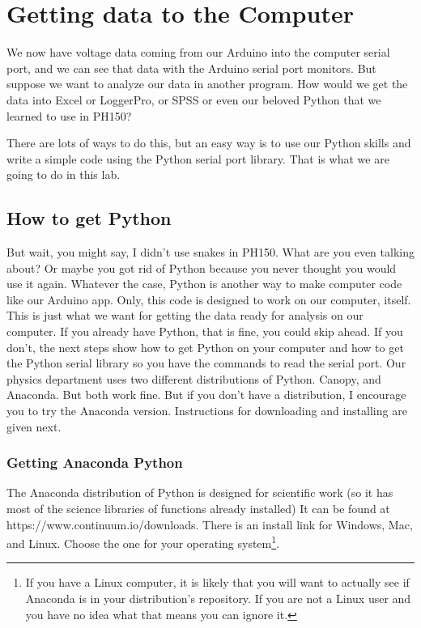 \chapter{Getting data to the Computer}
We now have voltage data coming from our Arduino into the computer serial
port, and we can see that data with the Arduino serial port monitors. But
suppose we want to analyze our data in another program. How would we get the
data into Excel or LoggerPro, or SPSS or even our beloved Python that we
learned to use in PH150?

There are lots of ways to do this, but an easy way is to use our Python
skills and write a simple code using the Python serial port library. That is
what we are going to do in this lab.

\section{How to get Python}

But wait, you might say, I didn't use snakes in PH150. What are you even
talking about? Or maybe you got rid of Python because you never thought you
would use it again. Whatever the case, Python is another way to make
computer code like our Arduino app. Only, this code is designed to work on
our computer, itself. This is just what we want for getting the data ready
for analysis on our computer. If you already have Python, that is fine, you
could skip ahead. If you don't, the next steps show how to get Python on
your computer and how to get the Python serial library so you have the
commands to read the serial port. Our physics department uses two different
distributions of Python. Canopy, and Anaconda. But both work fine. But if you don't have a distribution, I encourage you to try the Anaconda version. Instructions for downloading and installing are given next. 

\subsection{Getting Anaconda Python}

The Anaconda distribution of Python is designed for scientific work (so it
has most of the science libraries of functions already installed) It can be
found at https://www.continuum.io/downloads. There is an install link for
Windows, Mac, and Linux. Choose the one for your operating system\footnote{
If you have a Linux computer, it is likely that you will want to actually
see if Anaconda is in your distribution's repository. If you are not a Linux
user and you have no idea what that means you can ignore it.}.

